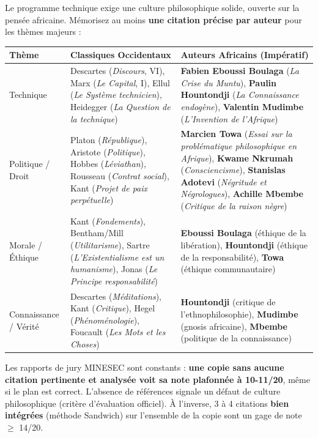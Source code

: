 \documentclass[11pt]{article}
\begin{document}
\begin{aretenir}
Le programme technique exige une culture philosophique solide, ouverte sur la pensée africaine. Mémorisez au moins \textbf{une citation précise par auteur} pour les thèmes majeurs :
\begin{center}
\begin{tabularx}{\linewidth}{|l|X|X|}\hline
\textbf{Thème} & \textbf{Classiques Occidentaux} & \textbf{Auteurs Africains (Impératif)} \\ \hline
Technique & Descartes (\emph{Discours}, VI), Marx (\emph{Le Capital}, I), Ellul (\emph{Le Système technicien}), Heidegger (\emph{La Question de la technique}) & \textbf{Fabien Eboussi Boulaga} (\emph{La Crise du Muntu}), \textbf{Paulin Hountondji} (\emph{La Connaissance endogène}), \textbf{Valentin Mudimbe} (\emph{L'Invention de l'Afrique}) \\ \hline
Politique / Droit & Platon (\emph{République}), Aristote (\emph{Politique}), Hobbes (\emph{Léviathan}), Rousseau (\emph{Contrat social}), Kant (\emph{Projet de paix perpétuelle}) & \textbf{Marcien Towa} (\emph{Essai sur la problématique philosophique en Afrique}), \textbf{Kwame Nkrumah} (\emph{Consciencisme}), \textbf{Stanislas Adotevi} (\emph{Négritude et Négrologues}), \textbf{Achille Mbembe} (\emph{Critique de la raison nègre}) \\ \hline
Morale / Éthique & Kant (\emph{Fondements}), Bentham/Mill (\emph{Utilitarisme}), Sartre (\emph{L'Existentialisme est un humanisme}), Jonas (\emph{Le Principe responsabilité}) & \textbf{Eboussi Boulaga} (éthique de la libération), \textbf{Hountondji} (éthique de la responsabilité), \textbf{Towa} (éthique communautaire) \\ \hline
Connaissance / Vérité & Descartes (\emph{Méditations}), Kant (\emph{Critique}), Hegel (\emph{Phénoménologie}), Foucault (\emph{Les Mots et les Choses}) & \textbf{Hountondji} (critique de l'ethnophilosophie), \textbf{Mudimbe} (gnosis africaine), \textbf{Mbembe} (politique de la connaissance) \\ \hline
\end{tabularx}
\end{center}
\end{aretenir}

\begin{savaistu}
Les rapports de jury MINESEC sont constants : \textbf{une copie sans aucune citation pertinente et analysée voit sa note plafonnée à 10-11/20}, même si le plan est correct. L'absence de références signale un défaut de \og culture philosophique \fg{} (critère d'évaluation officiel). À l'inverse, 3 à 4 citations \textbf{bien intégrées} (méthode Sandwich) sur l'ensemble de la copie sont un gage de note $\geq$ 14/20.
\end{savaistu}
\end{document}
